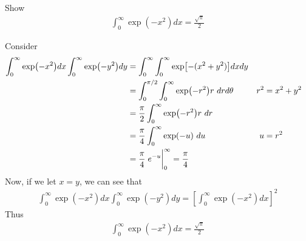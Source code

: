 \documentclass[12pt, english]{book}
\makeatletter
\renewenvironment{proof}[1][\proofname]{\par
	\pushQED{\qed}%
	\normalfont \topsep6\p@\@plus6\p@\relax
	\list{}{%
		\settowidth{\leftmargin}{\itshape\proofname:\hskip\labelsep}%
		\setlength{\labelwidth}{0pt}%
		\setlength{\itemindent}{-\leftmargin}%
		}%
	\item[\hskip\labelsep\itshape#1\@addpunct{:}]\ignorespaces
	}{\popQED\endlist\@endpefalse}
\makeatother
\begin{document}
	\begin{example}
		\label{int_0^infty e^(-x^2) dx Derivation Example - Complex}
		Show
		\begin{align*}
			\int_{0}^{\infty} \exp(-x^2) dx = \frac{\sqrt{\pi}}{2}
		\end{align*}
		\begin{proof}
			{\color{Grey}
			Consider 
			\begin{align*}
				\int_{0}^{\infty} \exp(-x^2) dx \int_{0}^{\infty} \exp(-y^2) dy
				&= \int_{0}^{\infty} \int_{0}^{\infty} \exp[-(x^2+y^2)] dxdy \\
				&= \int_{0}^{\pi/2} \int_{0}^{\infty} \exp(-r^2) r \ dr d\theta 
				  & r^2 &= x^2 + y^2 \\
				&= \frac{\pi}{2} \int_{0}^{\infty} \exp(-r^2) r \ dr \\
				&= \frac{\pi}{4} \int_{0}^{\infty} \exp(-u) \ du
					& u&=r^2 \\
				&= \frac{\pi}{4} \eval{e^{-u}}_{0}^{\infty} = \frac{\pi}{4}
			\end{align*}
			Now, if we let \(x=y\), we can see that 
			\begin{align*}
				\int_{0}^{\infty} \exp(-x^2) dx \int_{0}^{\infty} \exp(-y^2) dy 
				= \left[\int_{0}^{\infty} \exp(-x^2) dx \right]^2
			\end{align*}
			Thus
			\begin{align*}
				\int_{0}^{\infty} \exp(-x^2) dx = \frac{\sqrt{\pi}}{2}
			\end{align*}
			}
		\end{proof}
	\end{example}
\end{document}
